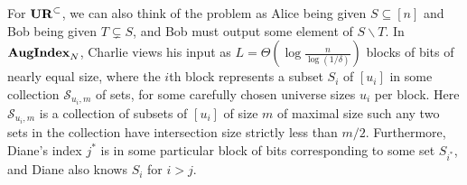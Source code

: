 For $\mathbf{UR}^\subset$, we can also think of the problem as Alice being given $S\subseteq[n]$ and Bob being given $T\subsetneq S$, and Bob must output some element of $S\backslash T$. %
In $\mathbf{AugIndex}_N$, Charlie views his input as $L = \Theta(\log \frac n{\log(1/\delta)})$ blocks of bits of nearly equal size, where the $i$th block represents a subset $S_i$ of $[u_i]$ in some collection $\mathcal S_{u_i,m}$ of sets, for some carefully chosen universe sizes $u_i$ per block. Here $\mathcal S_{u_i,m}$ is a collection of subsets of $[u_i]$ of size $m$ of maximal size such any two sets in the collection have intersection size strictly less than $m/2$. Furthermore,  Diane's index $j^*$ is in some particular block of bits corresponding to some set $S_{i^*}$, and Diane also knows $S_i$ for $i>j$.

